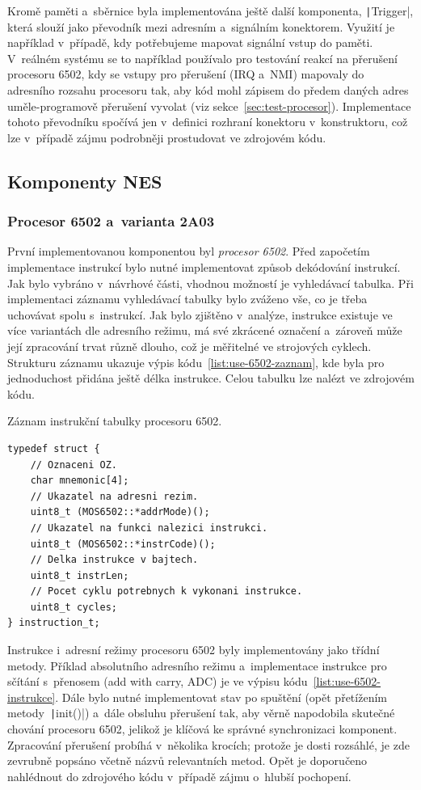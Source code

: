 Kromě paměti a~sběrnice byla implementována ještě další komponenta, \texttt|Trigger|, která slouží jako převodník mezi adresním a~signálním konektorem. Využití je například v~případě, kdy potřebujeme mapovat signální vstup do paměti. V~reálném systému se to například používalo pro testování reakcí na přerušení procesoru 6502, kdy se vstupy pro přerušení (IRQ a~NMI) mapovaly do adresního rozsahu procesoru tak, aby kód mohl zápisem do předem daných adres uměle-programově přerušení vyvolat (viz sekce~\ref{sec:test-procesor}). Implementace tohoto převodníku spočívá jen v~definici rozhraní konektoru v~konstruktoru, což lze v~případě zájmu podrobněji prostudovat ve zdrojovém kódu.

\subsection{Komponenty NES}
\subsubsection{Procesor 6502 a~varianta 2A03}
První implementovanou komponentou byl \emph{procesor 6502}. Před započetím implementace instrukcí bylo nutné implementovat způsob dekódování instrukcí. Jak bylo vybráno v~návrhové části, vhodnou možností je vyhledávací tabulka. Při implementaci záznamu vyhledávací tabulky bylo zváženo vše, co je třeba uchovávat spolu s~instrukcí. Jak bylo zjištěno v~analýze, instrukce existuje ve více variantách dle adresního režimu, má své zkrácené označení a~zároveň může její zpracování trvat různě dlouho, což je měřitelné ve strojových cyklech. Strukturu záznamu ukazuje výpis kódu~\ref{list:use-6502-zaznam}, kde byla pro jednoduchost přidána ještě délka instrukce. Celou tabulku lze nalézt ve zdrojovém kódu.

\begin{listing}
	\caption{Záznam instrukční tabulky procesoru 6502.}
	\label{list:use-6502-zaznam}
	\begin{verbatim}
typedef struct {
	// Oznaceni OZ.
	char mnemonic[4];
	// Ukazatel na adresni rezim.
	uint8_t (MOS6502::*addrMode)();
	// Ukazatel na funkci nalezici instrukci.
	uint8_t (MOS6502::*instrCode)();
	// Delka instrukce v bajtech.
	uint8_t instrLen;
	// Pocet cyklu potrebnych k vykonani instrukce.
	uint8_t cycles;
} instruction_t;
	\end{verbatim}
\end{listing}

Instrukce i~adresní režimy procesoru 6502 byly implementovány jako třídní metody. Příklad absolutního adresního režimu a~implementace instrukce pro sčítání s~přenosem (add with carry, ADC) je ve výpisu kódu~\ref{list:use-6502-instrukce}. Dále bylo nutné implementovat stav po spuštění (opět přetížením metody~\texttt|init()|) a~dále obsluhu přerušení tak, aby věrně napodobila skutečné chování procesoru 6502, jelikož je klíčová ke správné synchronizaci komponent. Zpracování přerušení probíhá v~několika krocích; protože je dosti rozsáhlé, je zde zevrubně popsáno včetně názvů relevantních metod. Opět je doporučeno nahlédnout do zdrojového kódu v~případě zájmu o~hlubší pochopení.

